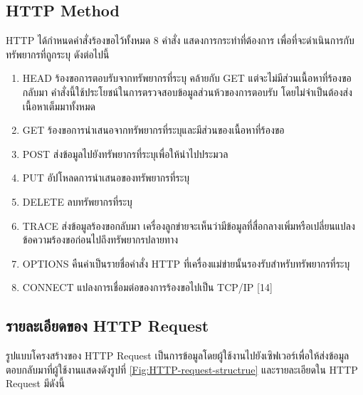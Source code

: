 	\subsection{HTTP Method}
		HTTP ได้กำหนดคำสั่งร้องขอไว้ทั้งหมด 8 คำสั่ง แสดงการกระทำที่ต้องการ เพื่อที่จะดำเนินการกับทรัพยากรที่ถูกระบุ ดังต่อไปนี้

		\begin{enumerate}
			\item HEAD ร้องขอการตอบรับจากทรัพยากรที่ระบุ คล้ายกับ GET แต่จะไม่มีส่วนเนื้อหาที่ร้องขอกลับมา คำสั่งนี้ใช้ประโยชน์ในการตรวจสอบข้อมูลส่วนห้วของการตอบรับ โดยไม่จำเป็นต้องส่งเนื้อหาเต็มมาทั้งหมด
			\item GET ร้องขอการนำเสนอจากทรัพยากรที่ระบุและมีส่วนของเนื้อหาที่ร้องขอ
			\item POST ส่งข้อมูลไปยังทรัพยากรที่ระบุเพื่อให้นำไปประมวล
			\item PUT อัปโหลดการนำเสนอของทรัพยากรที่ระบุ
			\item DELETE ลบทรัพยากรที่ระบุ
			\item TRACE ส่งข้อมูลร้องขอกลับมา เครื่องลูกข่ายจะเห็นว่ามีข้อมูลที่สื่อกลางเพิ่มหรือเปลี่ยนแปลงข้อความร้องขอก่อนไปถึงทรัพยากรปลายทาง
			\item OPTIONS คืนค่าเป็นรายชื่อคำสั่ง HTTP ที่เครื่องแม่ข่ายนั้นรองรับสำหรับทรัพยากรที่ระบุ
			\item CONNECT แปลงการเชื่อมต่อของการร้องขอไปเป็น TCP/IP [14]
		\end{enumerate}

	\subsection{รายละเอียดของ HTTP Request}
		รูปแบบโครงสร้างของ HTTP Request เป็นการข้อมูลโดยผู้ใช้งานไปยังเซิฟเวอร์เพื่อให้ส่งข้อมูลตอบกลับมาที่ผู้ใช้งานแสดงดังรูปที่ \ref{Fig:HTTP-request-structrue} และรายละเอียดใน HTTP Request มีดังนี้
